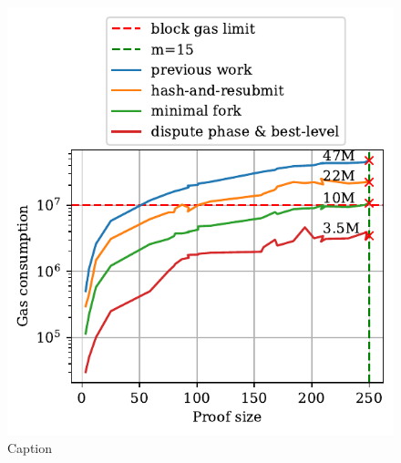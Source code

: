 \begin{figure}[!h]
    \begin{center}
        \includegraphics[width=1\columnwidth]{figures/dispute-best-level.pdf}
    \end{center}
    \caption{Caption}
    \label{fig:dispute-best-level}
\end{figure}

